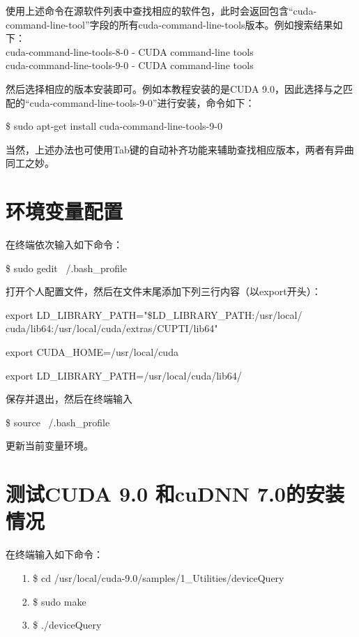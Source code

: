 \documentclass[11pt,a4paper]{ctexart}
\begin{document}
使用上述命令在源软件列表中查找相应的软件包，此时会返回包含“cuda-command-line-tool”字段的所有cuda-command-line-tools版本。例如搜索结果如下：\\
cuda-command-line-tools-8-0 - CUDA command-line tools\\
cuda-command-line-tools-9-0 - CUDA command-line tools

然后选择相应的版本安装即可。例如本教程安装的是CUDA 9.0，因此选择与之匹配的“{\color{red}cuda-command-line-tools-9-0}”进行安装，命令如下：
\begin{center}
\$ sudo apt-get install cuda-command-line-tools-9-0
\end{center}

当然，上述办法也可使用Tab键的自动补齐功能来辅助查找相应版本，两者有异曲同工之妙。



\section{环境变量配置}
在终端依次输入如下命令：
\vspace{-0.2cm}
\begin{center}
\$ sudo gedit ~/.bash\_profile
\end{center}
打开个人配置文件，然后在文件末尾添加下列三行内容（以export开头）：
\begin{center}
export LD\_LIBRARY\_PATH="\$LD\_LIBRARY\_PATH:/usr/local/
cuda/lib64:/usr/local/cuda/extras/CUPTI/lib64"

export CUDA\_HOME=/usr/local/cuda

export LD\_LIBRARY\_PATH=/usr/local/cuda/lib64/
\end{center}
保存并退出，然后在终端输入
\vspace{-0.2cm}
\begin{center}
\$ source ~/.bash\_profile
\end{center}
更新当前变量环境。



\section{测试CUDA 9.0 和cuDNN 7.0的安装情况}
在终端输入如下命令：
\begin{itemize}
\item[1.] \$ cd  /usr/local/cuda-9.0/samples/1\_Utilities/deviceQuery
\item[2.] \$ sudo make
\item[3.] \$ ./deviceQuery
\end{itemize}
\end{document}
